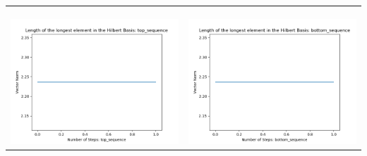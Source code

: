 \documentclass[10pt]{article}
\begin{document}
\begin{tabular}{c|c}
\begin{minipage}{.45\textwidth}
\end{minipage} \\ \\
\hline \\\begin{minipage}{.45\textwidth}
\includegraphics[width=\textwidth]{"DATA/5d/5 generators 1 bound B/top_sequence LENGTH"}
\end{minipage} &
\begin{minipage}{.45\textwidth}
\includegraphics[width=\textwidth]{"DATA/5d/5 generators 1 bound B bottomup/bottom_sequence LENGTH"}
\end{minipage}
\end{tabular}
\end{document}
